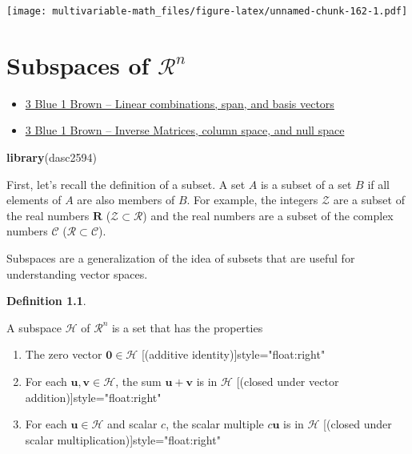 \documentclass[
]{book}
\newenvironment{Shaded}{\begin{snugshade}}{\end{snugshade}}
\newcommand{\KeywordTok}[1]{\textcolor[rgb]{0.13,0.29,0.53}{\textbf{#1}}}
\newcommand{\NormalTok}[1]{#1}
\theoremstyle{definition}
\newtheorem{definition}{Definition}[chapter]
\theoremstyle{definition}
\theoremstyle{definition}
\theoremstyle{remark}
\begin{document}
\texttt{[image: multivariable-math\_files/figure-latex/unnamed-chunk-162-1.pdf]}

\hypertarget{subspaces-Rn}{%
\chapter{\texorpdfstring{Subspaces of \(\mathcal{R}^n\)}{Subspaces of \textbackslash mathcal\{R\}\^{}n}}\label{subspaces-Rn}}

\begin{itemize}
\item
  \href{https://www.3blue1brown.com/lessons/span}{3 Blue 1 Brown -- Linear combinations, span, and basis vectors}
\item
  \href{https://www.3blue1brown.com/lessons/inverse-matrices}{3 Blue 1 Brown -- Inverse Matrices, column space, and null space}
\end{itemize}

\begin{Shaded}
\begin{Highlighting}[]
\KeywordTok{library}\NormalTok{(dasc2594)}
\end{Highlighting}
\end{Shaded}

First, let's recall the definition of a subset. A set \(A\) is a subset of a set \(B\) if all elements of \(A\) are also members of \(B\). For example, the integers \(\mathcal{Z}\) are a subset of the real numbers \(\mathbf{R}\) (\(\mathcal{Z} \subset \mathcal{R}\)) and the real numbers are a subset of the complex numbers \(\mathcal{C}\) (\(\mathcal{R} \subset \mathcal{C}\)).

Subspaces are a generalization of the idea of subsets that are useful for understanding vector spaces.

\begin{definition}
\protect\hypertarget{def:subspace}{}\label{def:subspace}

A subspace \(\mathcal{H}\) of \(\mathcal{R}^n\) is a set that has the properties

\begin{enumerate}
\def\labelenumi{\arabic{enumi})}
\item
  The zero vector \(\mathbf{0} \in \mathcal{H}\) \hfill \hfill [(additive identity)]{style="float:right"}
\item
  For each \(\mathbf{u}, \mathbf{v} \in \mathcal{H}\), the sum \(\mathbf{u} + \mathbf{v}\) is in \(\mathcal{H}\) \hfill [(closed under vector addition)]{style="float:right"}
\item
  For each \(\mathbf{u} \in \mathcal{H}\) and scalar \(c\), the scalar multiple \(c \mathbf{u}\) is in \(\mathcal{H}\) \hfill [(closed under scalar multiplication)]{style="float:right"}
\end{enumerate}

\end{definition}
\end{document}
